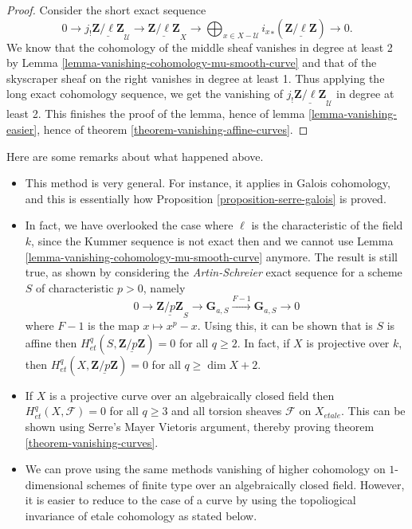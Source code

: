 \begin{proof}
Consider the short exact sequence
$$
0 \longrightarrow j_!\underline{\mathbf{Z}/\ell\mathbf{Z}}_\mathcal{U}
\longrightarrow \underline{\mathbf{Z}/\ell\mathbf{Z}}_X \longrightarrow
\bigoplus_{x \in X-\mathcal{U}} {i_x}_*(\underline{\mathbf{Z}/\ell\mathbf{Z}})
\longrightarrow 0.
$$
We know that the cohomology of the middle sheaf vanishes in degree at least 2
by
Lemma \ref{lemma-vanishing-cohomology-mu-smooth-curve}
and that of the skyscraper
sheaf on the right vanishes in degree at least 1. Thus applying the long exact
cohomology sequence, we get the vanishing of
$j_!\underline{\mathbf{Z}/\ell\mathbf{Z}}_\mathcal{U}$ in degree at least 2.
This finishes the proof of the lemma, hence of lemma
\ref{lemma-vanishing-easier}, hence of theorem
\ref{theorem-vanishing-affine-curves}.
\end{proof}

\begin{remarks}
\label{remarks-on-above}
Here are some remarks about what happened above.
\begin{itemize}
\item This method is very general. For instance, it applies in Galois
cohomology, and this is essentially how
Proposition \ref{proposition-serre-galois} is proved.
\item In fact, we have overlooked the case where $\ell$ is the characteristic
of the field $k$, since the Kummer sequence is not exact then and we cannot
use Lemma \ref{lemma-vanishing-cohomology-mu-smooth-curve} anymore.
The result is still true, as shown by considering the
{\it Artin-Schreier} exact sequence for a scheme $S$ of characteristic
$p >0$, namely
$$
0 \longrightarrow \underline{\mathbf{Z}/p\mathbf{Z}}_S \longrightarrow
\mathbf{G}_{a,S} \xrightarrow{F-1} \mathbf{G}_{a,S} \longrightarrow 0
$$
where $F - 1$ is the map $x \mapsto x^p - x$. Using this, it can be
shown that is
$S$ is affine then $H_{et}^q(S,\underline{\mathbf{Z}/p\mathbf{Z}}) = 0$ for all
$q \geq 2$. In fact, if $X$ is projective over $k$, then
$H_{et}^q(X,\underline{\mathbf{Z}/p\mathbf{Z}}) = 0$ for all $q \geq \dim X+2$.
\item If $X$ is a projective curve over an algebraically closed field then
$H_{et}^q(X,\mathcal{F}) = 0$ for all $q \geq 3$ and all torsion sheaves
$\mathcal{F}$ on $X_{etale}$. This can be shown using Serre's Mayer Vietoris
argument, thereby proving theorem \ref{theorem-vanishing-curves}.
\item We can prove using the same methods vanishing of higher cohomology
on $1$-dimensional schemes of finite type over an algebraically closed field.
However, it is easier to reduce to the case of a curve by using the
topoliogical invariance of etale cohomology as stated below.
\end{itemize}
\end{remarks}

